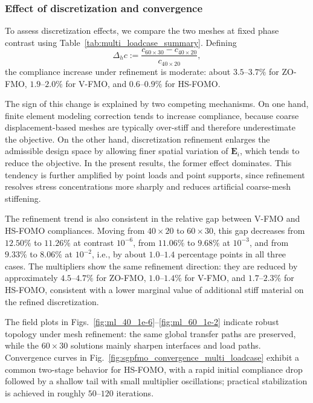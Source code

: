 \documentclass[preprint,3p]{elsarticle}
\newcommand{\tensf}[1]{\bm{\mathbf{#1}}}            %
\newcommand{\Ei}{\tensf{E}_i}                       %
\begin{document}
\subsubsection{Effect of discretization and convergence}\label{sec:multi_loadcase_discretization}

To assess discretization effects, we compare the two meshes at fixed phase contrast using Table~\ref{tab:multi_loadcase_summary}. Defining
%
\begin{equation}
\Delta_h c := \frac{c_{60\times30}-c_{40\times20}}{c_{40\times20}},
\end{equation}
%
the compliance increase under refinement is moderate: about $3.5$--$3.7\%$ for ZO-FMO, $1.9$--$2.0\%$ for V-FMO, and $0.6$--$0.9\%$ for HS-FOMO.

The sign of this change is explained by two competing mechanisms. On one hand, finite element modeling correction tends to increase compliance, because coarse displacement-based meshes are typically over-stiff and therefore underestimate the objective. On the other hand, discretization refinement enlarges the admissible design space by allowing finer spatial variation of $\Ei$, which tends to reduce the objective. In the present results, the former effect dominates. This tendency is further amplified by point loads and point supports, since refinement resolves stress concentrations more sharply and reduces artificial coarse-mesh stiffening.

The refinement trend is also consistent in the relative gap between V-FMO and HS-FOMO compliances. Moving from $40\times20$ to $60\times30$, this gap decreases from $12.50\%$ to $11.26\%$ at contrast $10^{-6}$, from $11.06\%$ to $9.68\%$ at $10^{-3}$, and from $9.33\%$ to $8.06\%$ at $10^{-2}$, i.e., by about $1.0$--$1.4$ percentage points in all three cases. The multipliers show the same refinement direction: they are reduced by approximately $4.5$--$4.7\%$ for ZO-FMO, $1.0$--$1.4\%$ for V-FMO, and $1.7$--$2.3\%$ for HS-FOMO, consistent with a lower marginal value of additional stiff material on the refined discretization.

The field plots in Figs.~\ref{fig:ml_40_1e-6}--\ref{fig:ml_60_1e-2} indicate robust topology under mesh refinement: the same global transfer paths are preserved, while the $60\times30$ solutions mainly sharpen interfaces and load paths. Convergence curves in Fig.~\ref{fig:sgpfmo_convergence_multi_loadcase} exhibit a common two-stage behavior for HS-FOMO, with a rapid initial compliance drop followed by a shallow tail with small multiplier oscillations; practical stabilization is achieved in roughly $50$--$120$ iterations.
\end{document}
